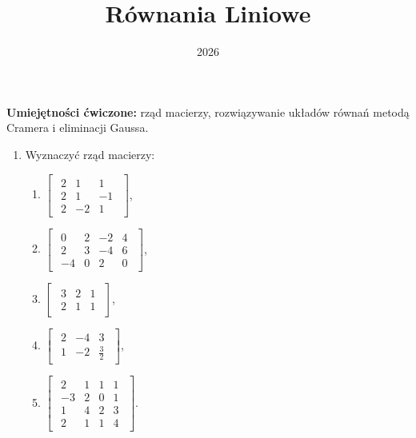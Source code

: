 \documentclass{article}
\title{Równania Liniowe}
\date{2026}
\begin{document}
\maketitle

\begin{center}
\textbf{Umiejętności ćwiczone:} rząd macierzy, rozwiązywanie układów równań metodą Cramera i eliminacji Gaussa.
\end{center}



\begin{enumerate}
    \item Wyznaczyć rząd macierzy:
        \begin{enumerate}
            \item $\begin{bmatrix}\begin{array}{rrr} 2 & 1 & 1\\ 2 & 1 & -1\\ 2 & -2 & 1 \end{array}\end{bmatrix}$,
            \item $\begin{bmatrix}\begin{array}{rrrr} 0 & 2 & -2 & 4\\ 2 & 3 & -4 & 6\\ -4 & 0 & 2 & 0 \end{array}\end{bmatrix}$,
            \item $\begin{bmatrix}\begin{array}{rrr} 3 & 2 & 1\\ 2 & 1 & 1 \end{array}\end{bmatrix}$,
            \item $\begin{bmatrix}\begin{array}{rrr} 2 & -4 & 3\\ 1 & -2 & \frac{3}{2} \end{array}\end{bmatrix}$,
            \item $\begin{bmatrix}\begin{array}{rrrr} 2 & 1 & 1 & 1\\ -3 & 2 & 0 & 1\\ 1 & 4 & 2 & 3\\ 2 & 1 & 1 & 4 \end{array}\end{bmatrix}$.
        \end{enumerate}


\end{enumerate}
\end{document}
